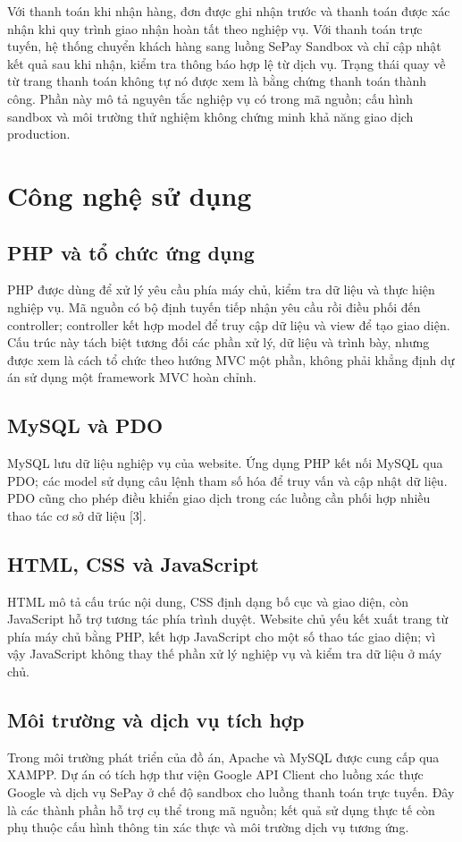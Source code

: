 Với thanh toán khi nhận hàng, đơn được ghi nhận trước và thanh toán được xác nhận khi quy trình giao nhận hoàn tất theo nghiệp vụ. Với thanh toán trực tuyến, hệ thống chuyển khách hàng sang luồng SePay Sandbox và chỉ cập nhật kết quả sau khi nhận, kiểm tra thông báo hợp lệ từ dịch vụ. Trạng thái quay về từ trang thanh toán không tự nó được xem là bằng chứng thanh toán thành công. Phần này mô tả nguyên tắc nghiệp vụ có trong mã nguồn; cấu hình sandbox và môi trường thử nghiệm không chứng minh khả năng giao dịch production.

\section{Công nghệ sử dụng}
\subsection{PHP và tổ chức ứng dụng}
PHP được dùng để xử lý yêu cầu phía máy chủ, kiểm tra dữ liệu và thực hiện nghiệp vụ. Mã nguồn có bộ định tuyến tiếp nhận yêu cầu rồi điều phối đến controller; controller kết hợp model để truy cập dữ liệu và view để tạo giao diện. Cấu trúc này tách biệt tương đối các phần xử lý, dữ liệu và trình bày, nhưng được xem là cách tổ chức theo hướng MVC một phần, không phải khẳng định dự án sử dụng một framework MVC hoàn chỉnh.

\subsection{MySQL và PDO}
MySQL lưu dữ liệu nghiệp vụ của website. Ứng dụng PHP kết nối MySQL qua PDO; các model sử dụng câu lệnh tham số hóa để truy vấn và cập nhật dữ liệu. PDO cũng cho phép điều khiển giao dịch trong các luồng cần phối hợp nhiều thao tác cơ sở dữ liệu [3].

\subsection{HTML, CSS và JavaScript}
HTML mô tả cấu trúc nội dung, CSS định dạng bố cục và giao diện, còn JavaScript hỗ trợ tương tác phía trình duyệt. Website chủ yếu kết xuất trang từ phía máy chủ bằng PHP, kết hợp JavaScript cho một số thao tác giao diện; vì vậy JavaScript không thay thế phần xử lý nghiệp vụ và kiểm tra dữ liệu ở máy chủ.

\subsection{Môi trường và dịch vụ tích hợp}
Trong môi trường phát triển của đồ án, Apache và MySQL được cung cấp qua XAMPP. Dự án có tích hợp thư viện Google API Client cho luồng xác thực Google và dịch vụ SePay ở chế độ sandbox cho luồng thanh toán trực tuyến. Đây là các thành phần hỗ trợ cụ thể trong mã nguồn; kết quả sử dụng thực tế còn phụ thuộc cấu hình thông tin xác thực và môi trường dịch vụ tương ứng.

